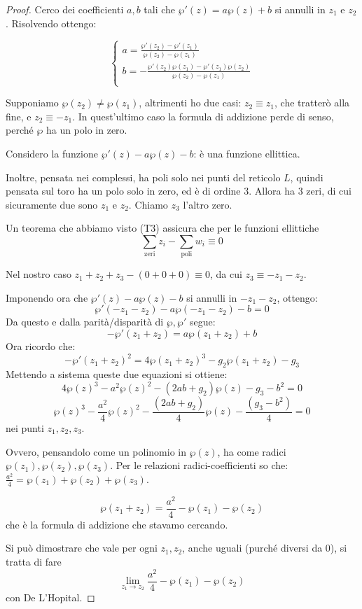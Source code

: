 \begin{proof}
Cerco dei coefficienti $a,b$ tali che $\wp'(z)=a\wp(z)+b$ si annulli in $z_1$ e $z_2$.
Risolvendo ottengo:

\begin{displaymath}
  \left\{
    \begin{array}{l}
      a = \frac{\wp'(z_2) - \wp'(z_1)}{\wp(z_2) - \wp(z_1)} \\
      b = - \frac{\wp'(z_2) \wp(z_1) - \wp'(z_1) \wp(z_2)}{\wp(z_2) - \wp(z_1)} \\
    \end{array}
  \right.
\end{displaymath}

Supponiamo $\wp(z_2) \neq \wp(z_1)$, altrimenti ho due casi: $z_2 \equiv z_1$, che tratterò alla fine, e $z_2 \equiv -z_1$.
In quest'ultimo caso la formula di addizione perde di senso, perché $\wp$ ha un polo in zero.


Considero la funzione $\wp'(z) - a \wp(z) - b$: è una funzione ellittica.

Inoltre, pensata nei complessi, ha poli solo nei punti del reticolo $L$, quindi pensata sul toro ha un polo solo in zero, ed è di ordine 3.
Allora ha 3 zeri, di cui sicuramente due sono $z_1$ e $z_2$. Chiamo $z_3$ l'altro zero.

Un teorema che abbiamo visto (T3) assicura che per le funzioni ellittiche $$ \sum_\text{zeri} z_i - \sum_\text{poli} w_i \equiv 0$$

Nel nostro caso $z_1 + z_2 + z_3 - (0+0+0) \equiv 0$, da cui $z_3 \equiv - z_1 - z_2$.

Imponendo ora che $\wp'(z) - a \wp(z) - b$ si annulli in $ -z_1 - z_2 $, ottengo:
$$ \wp'(-z_1-z_2) - a \wp(-z_1-z_2) - b = 0 $$
Da questo e dalla parità/disparità di $ \wp, \wp' $ segue:
$$ - \wp'(z_1+z_2) = a \wp(z_1+z_2) + b $$
Ora ricordo che: $$ - \wp'(z_1+z_2)^2 = 4 \wp(z_1+z_2)^3 - g_2 \wp(z_1+z_2) - g_3 $$
Mettendo a sistema queste due equazioni si ottiene:
$$4 \wp(z)^3 -a^2 \wp(z)^2 - (2ab+g_2) \wp(z) - g_3 - b^2=0$$
$$\wp(z)^3 -\frac{a^2}{4} \wp(z)^2 - \frac{(2ab+g_2)}{4} \wp(z) - \frac{(g_3 - b^2)}{4}=0$$
nei punti $z_1, z_2, z_3$.

Ovvero, pensandolo come un polinomio in $\wp(z)$, ha come radici $\wp(z_1), \wp(z_2), \wp(z_3)$.
Per le relazioni radici-coefficienti so che: $\frac{a^2}{4} = \wp(z_1) + \wp(z_2) + \wp(z_3)$.

$$\wp(z_1+z_2) = \frac{a^2}{4} - \wp(z_1) - \wp(z_2)$$
che è la formula di addizione che stavamo cercando.


Si può dimostrare che vale per ogni $z_1, z_2$, anche uguali (purché diversi da $0$), si tratta di fare
$$ \lim_{z_1 \rightarrow z_2} \frac{a^2}{4} - \wp(z_1) - \wp(z_2)$$ con De L'Hopital. 
\end{proof}


